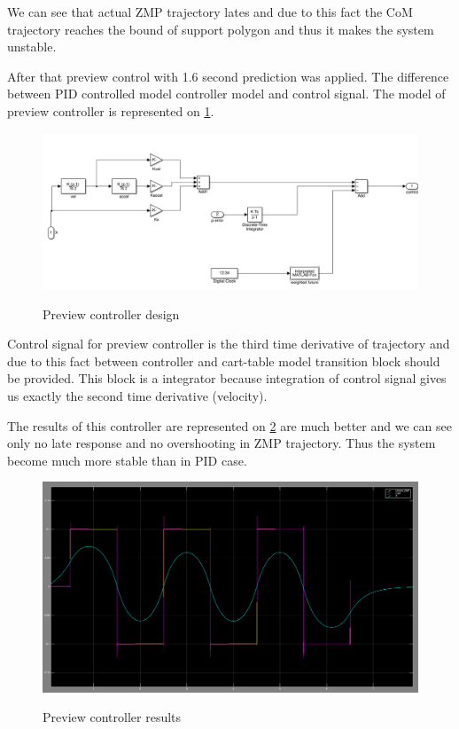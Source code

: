 \documentclass[12pt,a4paper]{report}
\begin{document}
		We can see that actual ZMP trajectory lates and due to this fact the CoM trajectory reaches the bound of support polygon and thus it makes the system unstable.
		
		After that preview control with 1.6 second prediction was applied. The difference between PID controlled model controller model and control signal. The model of preview controller  is represented on \cref{fig:18}.
		
		\begin{figure}[h!]
			\vspace{-0.2cm}
			\centering
			{\includegraphics[width=1\textwidth]{18}}
			\caption{Preview controller design}
			\label{fig:18}
			\vspace{-0.1cm}
		\end{figure}
		
		Control signal for preview controller is the third time derivative of trajectory and due to this fact between controller and cart-table model transition block should be provided. This block is a integrator because integration of control signal gives us exactly the second time derivative (velocity).
		
		The results of this controller are represented on \cref{fig:19} are much better and we can see only no late response and no overshooting in ZMP trajectory. Thus the system become much more stable than in PID case. 
		
		\begin{figure}[h!]
			\vspace{-0.2cm}
			\centering
			{\includegraphics[width=1\textwidth]{19}}
			\caption{Preview controller results}
			\label{fig:19}
			\vspace{-0.1cm}
		\end{figure}
\end{document}
